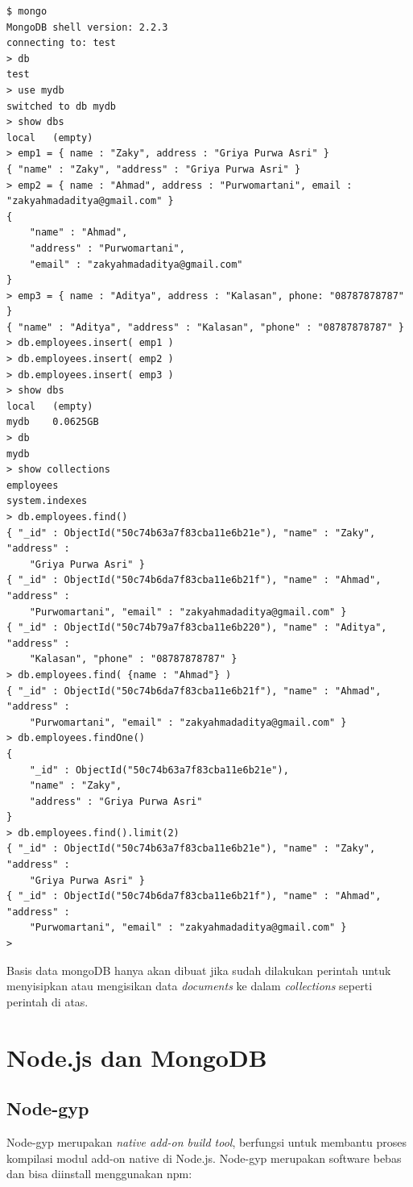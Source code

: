\lstset{language=bash,caption=Sesi dalam shell mongoDB}
\begin{lstlisting}
$ mongo
MongoDB shell version: 2.2.3
connecting to: test
> db
test
> use mydb
switched to db mydb
> show dbs
local	(empty)
> emp1 = { name : "Zaky", address : "Griya Purwa Asri" }
{ "name" : "Zaky", "address" : "Griya Purwa Asri" }
> emp2 = { name : "Ahmad", address : "Purwomartani", email : "zakyahmadaditya@gmail.com" }
{
	"name" : "Ahmad",
	"address" : "Purwomartani",
	"email" : "zakyahmadaditya@gmail.com"
}
> emp3 = { name : "Aditya", address : "Kalasan", phone: "08787878787" }
{ "name" : "Aditya", "address" : "Kalasan", "phone" : "08787878787" }
> db.employees.insert( emp1 )
> db.employees.insert( emp2 )
> db.employees.insert( emp3 )
> show dbs
local	(empty)
mydb	0.0625GB
> db
mydb
> show collections
employees
system.indexes
> db.employees.find()
{ "_id" : ObjectId("50c74b63a7f83cba11e6b21e"), "name" : "Zaky", "address" : 
	"Griya Purwa Asri" }
{ "_id" : ObjectId("50c74b6da7f83cba11e6b21f"), "name" : "Ahmad", "address" : 
	"Purwomartani", "email" : "zakyahmadaditya@gmail.com" }
{ "_id" : ObjectId("50c74b79a7f83cba11e6b220"), "name" : "Aditya", "address" : 
	"Kalasan", "phone" : "08787878787" }
> db.employees.find( {name : "Ahmad"} )
{ "_id" : ObjectId("50c74b6da7f83cba11e6b21f"), "name" : "Ahmad", "address" : 
	"Purwomartani", "email" : "zakyahmadaditya@gmail.com" }
> db.employees.findOne()
{
	"_id" : ObjectId("50c74b63a7f83cba11e6b21e"),
	"name" : "Zaky",
	"address" : "Griya Purwa Asri"
}
> db.employees.find().limit(2)
{ "_id" : ObjectId("50c74b63a7f83cba11e6b21e"), "name" : "Zaky", "address" : 
	"Griya Purwa Asri" }
{ "_id" : ObjectId("50c74b6da7f83cba11e6b21f"), "name" : "Ahmad", "address" : 
	"Purwomartani", "email" : "zakyahmadaditya@gmail.com" }
> 
\end{lstlisting}

Basis data mongoDB hanya akan dibuat jika sudah dilakukan perintah untuk menyisipkan atau mengisikan data \textit{documents} ke dalam \textit{collections} seperti perintah di atas.

\section{Node.js dan MongoDB}

\subsection{Node-gyp}

Node-gyp merupakan \textit{native add-on build tool}, berfungsi untuk membantu proses kompilasi modul add-on native di Node.js. Node-gyp merupakan software bebas dan bisa diinstall menggunakan npm:

